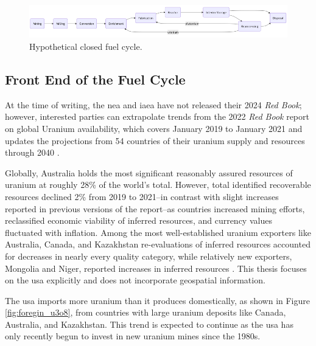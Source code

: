 \begin{figure}[H]
      \centering
      \includegraphics[scale=0.55]{images/nfc/closed_fc.png}
      \caption{Hypothetical closed fuel cycle.}
      \label{fig:closed_fc}
\end{figure}


\subsection{Front End of the Fuel Cycle}
\label{sec:front_end}
At the time of writing, the \gls{nea} and \gls{iaea} have not released their  2024 \textit{Red Book}; however, interested parties can extrapolate trends from the 2022 \textit{Red Book} report on global Uranium availability, which covers January 2019 to January 2021 and updates the projections from 54 countries of their uranium supply and resources through 2040 \cite{nea_red_book_2022}.

Globally, Australia holds the most significant reasonably assured resources
of uranium at roughly 28\% of the world's total. However, total identified recoverable resources declined 2\% from 2019 to 2021--in contrast with slight increases reported in previous versions of the report--as countries increased mining efforts, reclassified economic viability of inferred resources, and currency values fluctuated with inflation. Among the most well-established uranium exporters like Australia, Canada, and Kazakhstan re-evaluations of inferred resources accounted for decreases in nearly every quality category, while relatively new exporters, Mongolia and Niger, reported increases in inferred resources \cite{nea_red_book_2022}. This thesis focuses on the \gls{usa} explicitly and does not incorporate geospatial information.

The \gls{usa} imports more uranium than it produces domestically, as shown in Figure \ref{fig:foregin_u3o8}, from countries with large uranium deposits like Canada, Australia, and Kazakhstan. This trend is expected to continue as the \gls{usa} has only recently begun to invest in new uranium mines since the 1980s.

